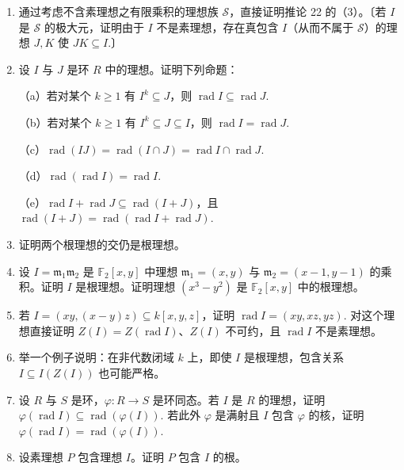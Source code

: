 \begin{enumerate}
\item 通过考虑不含素理想之有限乘积的理想族 \(\mathcal{S}\)，直接证明推论 22 的（3）。〔若 \(I\) 是 \(\mathcal{S}\) 的极大元，证明由于 \(I\) 不是素理想，存在真包含 \(I\)（从而不属于 \(\mathcal{S}\)）的理想 \(J, K\) 使 \(JK \subseteq I\).〕

\item 设 \(I\) 与 \(J\) 是环 \(R\) 中的理想。证明下列命题：

（a）若对某个 \(k \geq 1\) 有 \(I^k \subseteq J\)，则 \(\operatorname{rad}I \subseteq \operatorname{rad}J\).

（b）若对某个 \(k \geq 1\) 有 \(I^k \subseteq J \subseteq I\)，则 \(\operatorname{rad}I = \operatorname{rad}J\).

（c）\(\operatorname{rad}(IJ) = \operatorname{rad}(I \cap J) = \operatorname{rad}I \cap \operatorname{rad}J\).

（d）\(\operatorname{rad}(\operatorname{rad}I) = \operatorname{rad}I\).

（e）\(\operatorname{rad}I+\operatorname{rad}J \subseteq \operatorname{rad}(I+J)\)，且 \(\operatorname{rad}(I+J) = \operatorname{rad}(\operatorname{rad}I+\operatorname{rad}J)\).

\item 证明两个根理想的交仍是根理想。

\item 设 \(I = \mathfrak{m}_1\mathfrak{m}_2\) 是 \(\mathbb{F}_2[x,y]\) 中理想 \(\mathfrak{m}_1 = (x,y)\) 与 \(\mathfrak{m}_2 = (x-1,y-1)\) 的乘积。证明 \(I\) 是根理想。证明理想 \((x^3-y^2)\) 是 \(\mathbb{F}_2[x,y]\) 中的根理想。

\item 若 \(I = (xy, (x-y)z) \subseteq k[x,y,z]\)，证明 \(\operatorname{rad}I = (xy, xz, yz)\). 对这个理想直接证明 \(Z(I) = Z(\operatorname{rad}I)\)、\(Z(I)\) 不可约，且 \(\operatorname{rad}I\) 不是素理想。

\item 举一个例子说明：在非代数闭域 \(k\) 上，即使 \(I\) 是根理想，包含关系 \(I \subseteq I(Z(I))\) 也可能严格。

\item 设 \(R\) 与 \(S\) 是环，\(\varphi : R \to S\) 是环同态。若 \(I\) 是 \(R\) 的理想，证明 \(\varphi(\operatorname{rad}I) \subseteq \operatorname{rad}(\varphi(I))\). 若此外 \(\varphi\) 是满射且 \(I\) 包含 \(\varphi\) 的核，证明 \(\varphi(\operatorname{rad}I) = \operatorname{rad}(\varphi(I))\).

\item 设素理想 \(P\) 包含理想 \(I\)。证明 \(P\) 包含 \(I\) 的根。


\end{enumerate}
